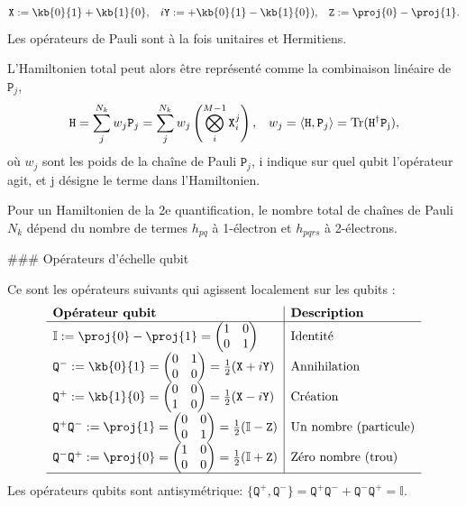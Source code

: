 \documentclass[12pt,a4paper]{article} %
\numberwithin{equation}{section} %
\numberwithin{figure}{section} %
\numberwithin{table}{section} %
\begin{document}
\begin{align}
&\mathtt{X}:=\kb{0}{1}+\kb{1}{0}, &i\mathtt{Y}&:=+\kb{0}{1}-\kb{1}{0}), &\mathtt{Z}:=\proj{0}-\proj{1}.
\end{align}
Les opérateurs de Pauli sont à la fois unitaires et Hermitiens.

L'Hamiltonien total peut alors être représenté comme la combinaison linéaire de $\mathtt{P}_j$,
\begin{align*}
&\mathtt{H}=\sum_j^{N_k}w_j\mathtt{P}_j=\sum_j^{N_k}w_j\left(\bigotimes_i^{M-1}\mathtt{X}_i^j\right),
&w_j=\langle\mathtt{H},\mathtt{P}_j\rangle=\rm{Tr}(\mathtt{H}^\dagger\mathtt{P}_j),
\end{align*}
où $w_j$ sont les poids de la chaîne de Pauli $\mathtt{P}_j$, i indique sur quel qubit l'opérateur agit, et j désigne le terme dans l'Hamiltonien.

Pour un Hamiltonien de la 2e quantification, le nombre total de chaînes de Pauli $N_k$ dépend du nombre de termes $h_{pq}$ à 1-électron et $h_{pqrs}$ à 2-électrons.


### Opérateurs d'échelle qubit

Ce sont les opérateurs suivants qui agissent localement sur les qubits :
$$
\begin{array}{l|l}
\textbf{Opérateur qubit}             &  \textbf{Description}\\\hline
\mathbb{I}:=\proj{0}-\proj{1}=\begin{pmatrix}1 & 0 \\ 0 &1 \end{pmatrix} &\text{Identité}\\
\mathtt{Q}^-:=\kb{0}{1}=\begin{pmatrix}0 & 1 \\ 0 & 0 \end{pmatrix}=\frac12(\mathtt{X} + i\mathtt{Y})  & \text{Annihilation} \\
\mathtt{Q}^+: =\kb{1}{0}=\begin{pmatrix}0 & 0 \\ 1 & 0 \end{pmatrix}=\frac12(\mathtt{X} - i\mathtt{Y}) & \text{Création}\\
\mathtt{Q}^+\mathtt{Q}^-:=\proj{1}=\begin{pmatrix}0 & 0 \\ 0 &1 \end{pmatrix}=\frac12(\mathbb{I} - \mathtt{Z}) & \text{Un nombre (particule)}\\
\mathtt{Q}^-\mathtt{Q}^+: =\proj{0}=\begin{pmatrix}1 & 0 \\ 0 &0 \end{pmatrix}=\frac12(\mathbb{I} + \mathtt{Z}) & \text{Zéro nombre (trou)}\\\hline
\end{array}
$$
Les opérateurs qubits sont antisymétrique: $\{\mathtt{Q}^+,\mathtt{Q}^-\}=\mathtt{Q}^+\mathtt{Q}^- + \mathtt{Q}^-\mathtt{Q}^+ = \mathbb{I}$.
\end{document}
